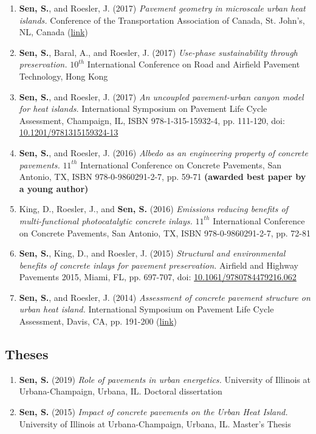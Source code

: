 \documentclass[12pt]{article}
\begin{document}
\begin{enumerate}[label=(C\arabic*)]
	\item \textbf{Sen, S.}, and Roesler, J. (2017) \textit{Pavement geometry in microscale urban heat islands.} Conference of the Transportation Association of Canada, St. John’s, NL, Canada (\href{http://www.tac-atc.ca/sites/default/files/conf_papers/sens_-_pavement_geometry_in_microscale_urban_heat_islands.pdf}{link})
	\item \textbf{Sen, S.}, Baral, A., and Roesler, J. (2017) \textit{Use-phase sustainability through preservation.} $10^{th}$ International Conference on Road and Airfield Pavement Technology, Hong Kong
	\item \textbf{Sen, S.}, and Roesler, J. (2017) \textit{An uncoupled pavement-urban canyon model for heat islands.} International Symposium on Pavement Life Cycle Assessment, Champaign, IL, ISBN 978-1-315-15932-4, pp. 111-120, doi: \href{http://dx.doi.org/10.1201/9781315159324-13}{10.1201/9781315159324-13}
	\item \textbf{Sen, S.}, and Roesler, J. (2016) \textit{Albedo as an engineering property of concrete pavements.} $11^{th}$ International Conference on Concrete Pavements, San Antonio, TX, ISBN 978-0-9860291-2-7, pp. 59-71 \textbf{(awarded best paper by a young author)}
	\item King, D., Roesler, J., and \textbf{Sen, S.} (2016) \textit{Emissions reducing benefits of multi-functional photocatalytic concrete inlays.} $11^{th}$ International Conference on Concrete Pavements, San Antonio, TX, ISBN 978-0-9860291-2-7, pp. 72-81
	\item \textbf{Sen, S.}, King, D., and Roesler, J. (2015) \textit{Structural and environmental benefits of concrete inlays for pavement preservation.} Airfield and Highway Pavements 2015, Miami, FL, pp. 697-707, doi: \href{http://dx.doi.org/10.1061/9780784479216.062}{10.1061/9780784479216.062}
	\item \textbf{Sen, S.}, and Roesler, J. (2014) \textit{Assessment of concrete pavement structure on urban heat island.} International Symposium on Pavement Life Cycle Assessment, Davis, CA, pp. 191-200 (\href{http://www.ucprc.ucdavis.edu/p-LCA2014/media/pdf/Papers/LCA14_Urban\%20Heat\%20Island.pdf}{link})
\end{enumerate}

\hfill
\subsection*{Theses}
\begin{enumerate}[label=(T\arabic*)]
	\item \textbf{Sen, S.} (2019) \textit{Role of pavements in urban energetics.} University of Illinois at Urbana-Champaign, Urbana, IL. Doctoral dissertation
	\item \textbf{Sen, S.} (2015) \textit{Impact of concrete pavements on the 		Urban Heat Island.} University of Illinois at Urbana-Champaign, Urbana, IL. Master’s Thesis
\end{enumerate}
\end{document}
